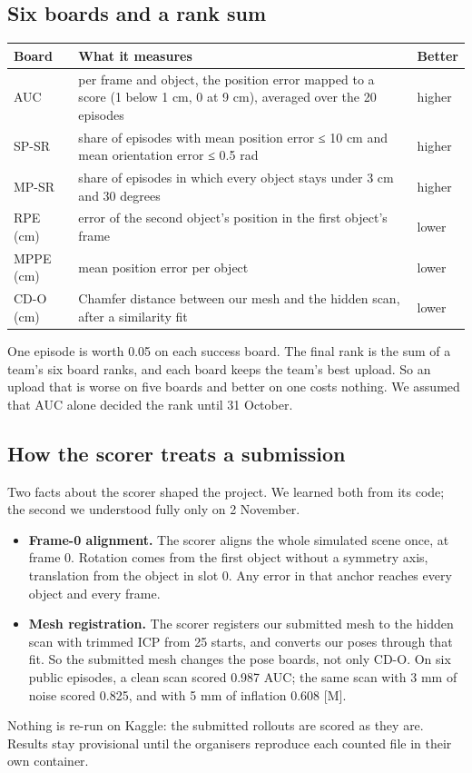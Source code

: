 \documentclass[11pt]{article}
\begin{document}
\subsection{Six boards and a rank sum}
\begin{table}[tbp]
\centering\small
\begin{tabularx}{\linewidth}{l>{\raggedright\arraybackslash}Xl}
\toprule
\textbf{Board} & \textbf{What it measures} & \textbf{Better} \\
\midrule
AUC & per frame and object, the position error mapped to a score (1 below 1 cm, 0 at 9 cm), averaged over the 20 episodes & higher \\
SP-SR & share of episodes with mean position error ≤ 10 cm and mean orientation error ≤ 0.5 rad & higher \\
MP-SR & share of episodes in which every object stays under 3 cm and 30 degrees & higher \\
RPE (cm) & error of the second object's position in the first object's frame & lower \\
MPPE (cm) & mean position error per object & lower \\
CD-O (cm) & Chamfer distance between our mesh and the hidden scan, after a similarity fit & lower \\
\bottomrule
\end{tabularx}
\end{table}
One episode is worth 0.05 on each success board. The final rank is the sum of a team's six board ranks, and each board keeps the team's best upload. So an upload that is worse on five boards and better on one costs nothing. We assumed that AUC alone decided the rank until 31 October.

\subsection{How the scorer treats a submission}
Two facts about the scorer shaped the project. We learned both from its code; the second we understood fully only on 2 November.

\begin{itemize}[itemsep=2pt,topsep=3pt]
\item \textbf{Frame-0 alignment.} The scorer aligns the whole simulated scene once, at frame 0. Rotation comes from the first object without a symmetry axis, translation from the object in slot 0. Any error in that anchor reaches every object and every frame.
\item \textbf{Mesh registration.} The scorer registers our submitted mesh to the hidden scan with trimmed ICP \cite{r53,r54} from 25 starts, and converts our poses through that fit. So the submitted mesh changes the pose boards, not only CD-O. On six public episodes, a clean scan scored 0.987 AUC; the same scan with 3 mm of noise scored 0.825, and with 5 mm of inflation 0.608 {[}M{]}.
\end{itemize}
Nothing is re-run on Kaggle: the submitted rollouts are scored as they are. Results stay provisional until the organisers reproduce each counted file in their own container.
\end{document}
